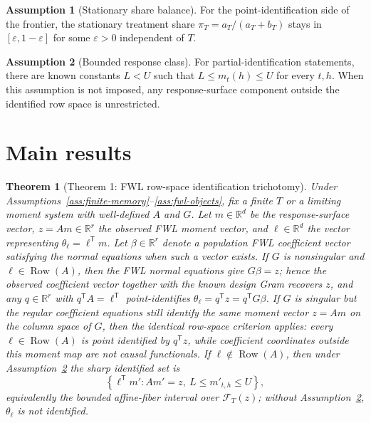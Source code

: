 \documentclass[11pt]{article}
\newcommand{\transpose}{\mathsf{T}}
\theoremstyle{definition}
\newtheorem{assumption}{Assumption}
\theoremstyle{plain}
\newtheorem{theorem}{Theorem}
\theoremstyle{remark}
\begin{document}
\begin{assumption}[Stationary share balance]\label{ass:share-balance}
For the point-identification side of the frontier, the stationary treatment share \(\pi_T=a_T/(a_T+b_T)\) stays in \([\varepsilon,1-\varepsilon]\) for some \(\varepsilon>0\) independent of \(T\).
\end{assumption}

\begin{assumption}[Bounded response class]\label{ass:bounded-response}
For partial-identification statements, there are known constants \(L<U\) such that \(L\le m_t(h)\le U\) for every \(t,h\).
When this assumption is not imposed, any response-surface component outside the identified row space is unrestricted.
\end{assumption}

\section{Main results}
\begin{theorem}[Theorem 1: FWL row-space identification trichotomy]\label{thm:rank-trichotomy}
Under Assumptions~\ref{ass:finite-memory}--\ref{ass:fwl-objects}, fix a finite \(T\) or a limiting moment system with well-defined \(A\) and \(G\).
Let \(m\in\mathbb R^d\) be the response-surface vector, \(z=Am\in\mathbb R^r\) the observed FWL moment vector, and \(\ell\in\mathbb R^d\) the vector representing \(\theta_\ell=\ell^\transpose m\).
Let \(\beta\in\mathbb R^r\) denote a population FWL coefficient vector satisfying the normal equations when such a vector exists.
If \(G\) is nonsingular and \(\ell\in\operatorname{Row}(A)\), then the FWL normal equations give \(G\beta=z\); hence the observed coefficient vector together with the known design Gram recovers \(z\), and any \(q\in\mathbb R^r\) with \(q^\transpose A=\ell^\transpose\) point-identifies \(\theta_\ell=q^\transpose z=q^\transpose G\beta\).
If \(G\) is singular but the regular coefficient equations still identify the same moment vector \(z=Am\) on the column space of \(G\), then the identical row-space criterion applies: every \(\ell\in\operatorname{Row}(A)\) is point identified by \(q^\transpose z\), while coefficient coordinates outside this moment map are not causal functionals.
If \(\ell\notin\operatorname{Row}(A)\), then under Assumption~\ref{ass:bounded-response} the sharp identified set is
\[
\left\{\ell^\transpose m' : A m'=z,\ L\le m'_{t,h}\le U\right\},
\]
equivalently the bounded affine-fiber interval over \(\mathcal F_T(z)\); without Assumption~\ref{ass:bounded-response}, \(\theta_\ell\) is not identified.
\end{theorem}
\end{document}
